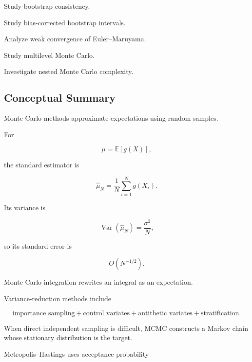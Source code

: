 \begin{exercise}[4]
Study bootstrap consistency.
\end{exercise}

\begin{exercise}[4]
Study bias-corrected bootstrap intervals.
\end{exercise}

\begin{exercise}[4]
Analyze weak convergence of Euler--Maruyama.
\end{exercise}

\begin{exercise}[4]
Study multilevel Monte Carlo.
\end{exercise}

\begin{exercise}[4]
Investigate nested Monte Carlo complexity.
\end{exercise}

\subsection{Conceptual Summary}
\label{subsec:monte-carlo-summary}

Monte Carlo methods approximate expectations using random samples.

For

\[
\boxed{
\mu
=
\mathbb{E}[g(X)],
}
\]

the standard estimator is

\[
\boxed{
\widehat{\mu}_N
=
\frac1N
\sum_{i=1}^{N}
g(X_i).
}
\]

Its variance is

\[
\boxed{
\operatorname{Var}
(
\widehat{\mu}_N
)
=
\frac{
\sigma^2
}{
N
},
}
\]

so its standard error is

\[
\boxed{
O(N^{-1/2}).
}
\]

Monte Carlo integration rewrites an integral as an expectation.

Variance-reduction methods include

\[
\boxed{
\text{importance sampling}
+
\text{control variates}
+
\text{antithetic variates}
+
\text{stratification}.
}
\]

When direct independent sampling is difficult, MCMC constructs a Markov
chain whose stationary distribution is the target.

Metropolis--Hastings uses acceptance probability


